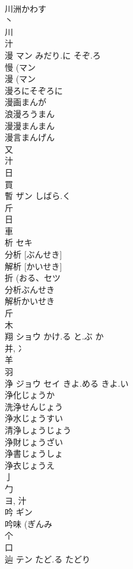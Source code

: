 \documentclass[8pt]{extreport}
\begin{document}
\begin{CJK}{UTF8}{min}
\\	川洲かわす 
\\	丶 
\\	川 
\\	汁 
\\	漫	マン	みだり.に そぞ.ろ	
\\	慢 (マン 
\\	漫 (マン 
\\	漫ろにそぞろに
\\	漫画まんが
\\	浪漫ろうまん
\\	漫漫まんまん
\\	漫言まんげん
\\	又 
\\	汁 
\\	日 
\\	買 
\\	暫	ザン	しばら.く	
\\	斤 
\\	日 
\\	車 
\\	析	セキ		
\\	分析 [ぶんせき] 
\\	解析 [かいせき] 
\\	折 (おる、セツ 
\\	分析ぶんせき
\\	解析かいせき
\\	斤 
\\	木 
\\	翔	ショウ	かけ.る と.ぶ か	
\\	并, 冫 
\\	羊 
\\	羽 
\\	浄	ジョウ セイ	きよ.める きよ.い	
\\	浄化じょうか 
\\	洗浄せんじょう 
\\	浄水じょうすい 
\\	清浄しょうじょう 
\\	浄財じょうざい 
\\	浄書じょうしょ 
\\	浄衣じょうえ 
\\	亅 
\\	勹 
\\	ヨ, 汁 
\\	吟	ギン		
\\	吟味 (ぎんみ 
\\	个 
\\	口 
\\	辿	テン	たど.る たどり	

\end{CJK}
\end{document}
